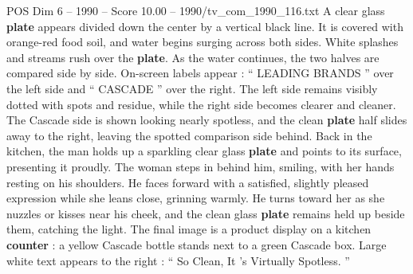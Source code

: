 \begin{textsample}{POS Dim 6 – 1990 – Score 10.00 – 1990/tv\_com\_1990\_116.txt}
A clear glass \textbf{plate} appears divided down the center by a vertical black line.
It is covered with orange-red food soil, and water begins surging across both sides.
White splashes and streams rush over the \textbf{plate}.
As the water continues, the two halves are compared side by side.
On-screen labels appear : “ LEADING BRANDS ” over the left side and “ CASCADE ” over the right.
The left side remains visibly dotted with spots and residue, while the right side becomes clearer and cleaner.
The Cascade side is shown looking nearly spotless, and the clean \textbf{plate} half slides away to the right, leaving the spotted comparison side behind.
Back in the kitchen, the man holds up a sparkling clear glass \textbf{plate} and points to its surface, presenting it proudly.
The woman steps in behind him, smiling, with her hands resting on his shoulders.
He faces forward with a satisfied, slightly pleased expression while she leans close, grinning warmly.
He turns toward her as she nuzzles or kisses near his cheek, and the clean glass \textbf{plate} remains held up beside them, catching the light.
The final image is a product display on a kitchen \textbf{counter} : a yellow Cascade bottle stands next to a green Cascade box.
Large white text appears to the right : “ So Clean, It ’s Virtually Spotless. ”

\end{textsample}
